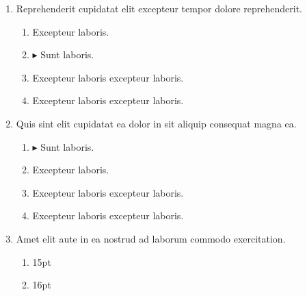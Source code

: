 \documentclass[a4paper,12pt]{article}
\begin{document}
\begin{enumerate}[label=\textbf{\arabic*.}]
\begin{multicols}{2}
\begin{enumerate}
		\item  Excepteur laboris excepteur laboris.
    
		\item  Excepteur laboris excepteur laboris.
  
	\end{enumerate}

\end{multicols}
\item Reprehenderit cupidatat elit excepteur tempor dolore reprehenderit.
\begin{multicols}{2}
	\begin{enumerate}
		\item  Excepteur laboris.
    
		\item $\blacktriangleright$  Sunt laboris.
    
		\item  Excepteur laboris excepteur laboris.
  
		\item  Excepteur laboris excepteur laboris.
    
	\end{enumerate}

\end{multicols}
\item Quis sint elit cupidatat ea dolor in sit aliquip consequat magna ea.
\begin{multicols}{2}
	\begin{enumerate}
		\item $\blacktriangleright$  Sunt laboris.
    
		\item  Excepteur laboris.
    
		\item  Excepteur laboris excepteur laboris.
    
		\item  Excepteur laboris excepteur laboris.
  
	\end{enumerate}

\end{multicols}
\item Amet elit aute in ea nostrud ad laborum commodo exercitation.
\begin{multicols}{4}
	\begin{enumerate}
		\item  15pt
    
		\item  16pt
  

\end{enumerate}
\end{multicols}
\end{enumerate}
\end{document}
